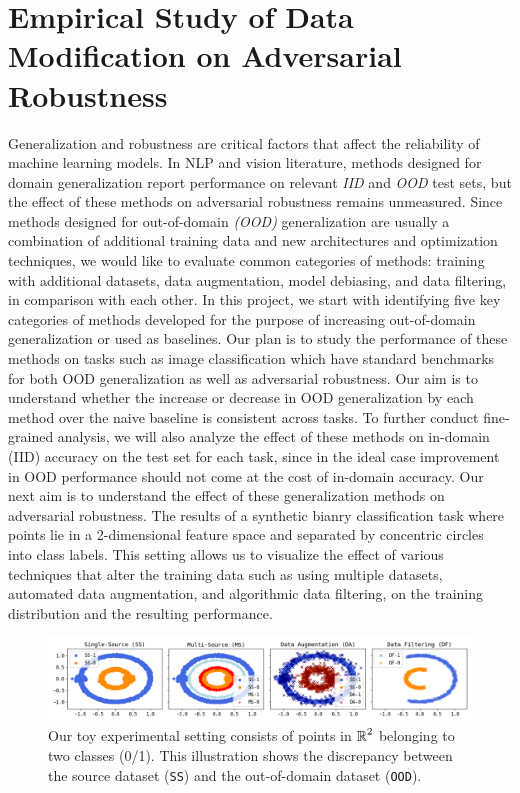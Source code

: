 \section{Empirical Study of Data Modification on Adversarial Robustness}
Generalization and robustness are critical factors that affect the reliability of machine learning models. 
In NLP and vision literature, methods designed for domain generalization report performance on relevant \textit{IID} and \textit{OOD} test sets, but the effect of these methods on adversarial robustness remains unmeasured.
Since methods designed for out-of-domain \textit{(OOD)} generalization are usually a combination of additional training data and new architectures and optimization techniques, we would like to evaluate common categories of methods: training with additional datasets, data augmentation, model debiasing, and data filtering, in comparison with each other.
In this project, we start with identifying five key categories of methods developed for the purpose of increasing out-of-domain generalization or used as baselines.
Our plan is to study the performance of these methods on tasks such as image classification which have standard benchmarks for both OOD generalization as well as adversarial robustness.
Our aim is to understand whether the increase or decrease in OOD generalization by each method over the naive baseline is consistent across tasks.
To further conduct fine-grained analysis, we will also analyze the effect of these methods on in-domain (IID) accuracy on the test set for each task, since in the ideal case improvement in OOD performance should not come at the cost of in-domain accuracy.
Our next aim is to understand the effect of these generalization methods on adversarial robustness.
The results of a synthetic bianry classification task where points lie in a 2-dimensional feature space and separated by concentric circles into class labels.
This setting allows us to visualize the effect of various techniques that alter the training data such as using multiple datasets, automated data augmentation, and algorithmic data filtering, on the training distribution and the resulting performance.
\begin{figure}
    \centering
    \includegraphics[width=\linewidth]{figures/viz_effect_on_distrib.png}
    \caption{Our toy experimental setting consists of points in $\operatorname{\mathbb{R}}^2$ belonging to two classes (0/1).
    This illustration shows the discrepancy between the source dataset (\texttt{SS}) and the out-of-domain dataset (\texttt{OOD}).
    }
    \label{fig:viz_effect_on_distrib}
\end{figure}
